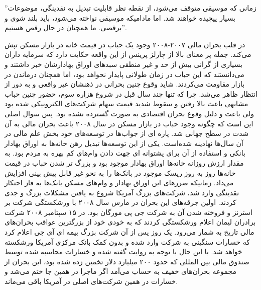 \documentclass[a4paper,titlepage,12pt,fleqn,oneside]{report}
\begin{document}
''زمانی که موسیقی متوقف می‌شود، از نقطه نظر قابلیت تبدیل به نقدینگی، موضوعات بسیار پیچیده خواهند شد. اما مادامیکه موسیقی نواخته می‌شود، باید بلند شوی و  برقصی. ما همچنان در حال رقص هستیم''.

در قلب بحران مالی ۲۰۰۷-۲۰۰۸ وجود یک حباب در قیمت خانه در بازار مسکن تپش می‌کند. جمله پر معنای بالا از چارلز پرینس از این واقعه حکایت دارد که سرمایه داران بسیاری از گرانی بیش از حد و غیر منطقی سبد‌های اوراق بهادارشان خبر داشتند و می‌دانستند که این حباب در زمان طولانی پایدار نحواهد بود، اما همچنان درماندن در بازار مقاومت می‌کردند. شاید وقوع چنین بحرانی در ذهنشان غیر واقعی و به دور از انتظار ظاهر می‌شد. چرا که تنها چند سال قبل در شروع هزاره سوم، حضور چنین حباب مشابهی باعث بالا رفتن و سقوط شدید قیمت سهام شرکت‌های الکترونیکی شده بود ولی باعث و دلیل وقوع بحران اقتصادی به صورت گسترده نشده بود. پس سوال اصلی این است که چگونه وجود حباب در بازار مسکن در سال ۲۰۰۸ باعث بحران مالی به آن شدت در سطح جهانی شد. پاره ای از جواب‌ها در توسعه‌های خود بخش علم مالی در آن سال‌ها نهادینه شده‌است. یکی از این توسعه‌ها تبدیل رهن خانه‌ها به اوراق بهادار بانکی و استفاده از آن برای پشتوانه ای جهت دادن وام‌های کم بهره به مردم بود. به مقدار ارزش روزانه خانه‌ها اوراق بهادار موجود بود و بزرگ تر شدن حباب در قیمت خانه‌ها روز به روز ریسک موجود در بانک‌ها را به نحو غیر قابل پیش بینی افزایش می‌داد. زمانیکه ضررهای این اوراق بهادار و وام‌های مسکن بانک‌ها به فاز احتکار نقدینگی وارد شد، شرکت‌های بزرگ آمریکا شروع به یافتن مشکلات بزرگ و جدی کردند. اولین جرقه‌های این بحران در مارس سال ۲۰۰۸ با ورشکستگی 
شرکت بر استرنز و فروخته شدن آن به شرکت جی پی مورگان بود. در ۱۵ سپتامبر ۲۰۰۸ شرکت برادران لیمان اعلام ورشکستگی کردند که به خودی خود از بزرگترین عواقب بحران‌های مالی تاریخ به شمار می‌رود. یک روز پس از آن شرکت بزرگ بیمه ای آی جی اعلام کرد که خسارات سنگینی به شرکت وارد شده و بدون کمک بانک مرکزی آمریکا ورشکسته خواهد شد. با این حال با توجه به روایت گفته شده و خسارات محاسبه شده توسط صندوق مالی بین المللی که حدود ۲۰۰ میلیارد دلار تخمین زده شده بود، این بحران از مجموعه بحران‌های خفیف به حساب می‌آمد اگر ماجرا در همین جا ختم می‌شد و خسارات در همین شرکت‌های اصلی در آمریکا باقی می‌ماند.
\end{document}
